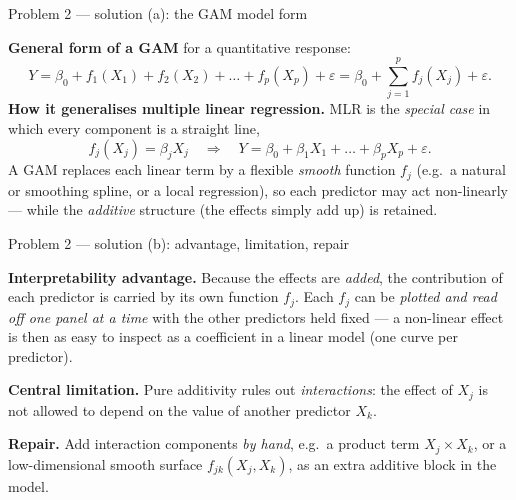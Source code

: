 \documentclass[aspectratio=169,11pt]{beamer}
\begin{document}
\begin{frame}{Problem 2 --- solution (a): the GAM model form}
  \begin{solutionbox}
    \textbf{General form of a GAM} for a quantitative response:
    \[
      Y=\beta_0+f_1(X_1)+f_2(X_2)+\dots+f_p(X_p)+\varepsilon
      =\beta_0+\sum_{j=1}^p f_j(X_j)+\varepsilon .
    \]
    \textbf{How it generalises multiple linear regression.} MLR is the \emph{special case} in which
    every component is a straight line,
    \[
      f_j(X_j)=\beta_j X_j\quad\Longrightarrow\quad Y=\beta_0+\beta_1X_1+\dots+\beta_pX_p+\varepsilon .
    \]
    A GAM replaces each linear term by a flexible \emph{smooth} function $f_j$ (e.g.\ a natural or
    smoothing spline, or a local regression), so each predictor may act non-linearly --- while the
    \emph{additive} structure (the effects simply add up) is retained.
  \end{solutionbox}
\end{frame}

\begin{frame}{Problem 2 --- solution (b): advantage, limitation, repair}
  \begin{solutionbox}
    \textbf{Interpretability advantage.} Because the effects are \emph{added}, the contribution of
    each predictor is carried by its own function $f_j$. Each $f_j$ can be \emph{plotted and read off
    one panel at a time} with the other predictors held fixed --- a non-linear effect is then as easy
    to inspect as a coefficient in a linear model (one curve per predictor).
    \medskip

    \textbf{Central limitation.} Pure additivity rules out \emph{interactions}: the effect of $X_j$
    is not allowed to depend on the value of another predictor $X_k$.
    \medskip

    \textbf{Repair.} Add interaction components \emph{by hand}, e.g.\ a product term $X_j\times X_k$,
    or a low-dimensional smooth surface $f_{jk}(X_j,X_k)$, as an extra additive block in the model.
  \end{solutionbox}
\end{frame}
\end{document}

